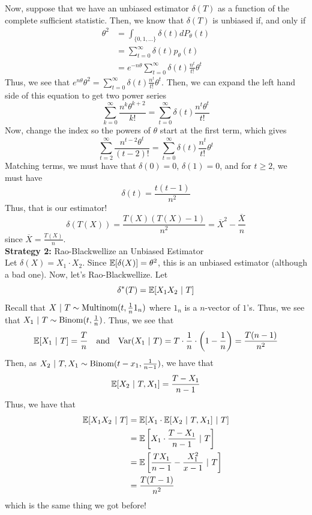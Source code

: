 Now, suppose that we have an unbiased estimator $\delta(T)$ as a function of the complete sufficient statistic. Then, we know that $\delta(T)$ is unbiased if, and only if
\begin{align*}
    \theta^2 &= \int_{\{0, 1, \ldots\}} \delta(t)dP_{\theta}(t)\\
    &= \sum_{t = 0}^{\infty} \delta(t)p_{\theta}(t)\\
    &= e^{-n\theta}\sum_{t = 0}^{\infty} \delta(t)\frac{n^{t}}{t!}\theta^t
\end{align*}
Thus, we see that $e^{n\theta} \theta^2 = \sum_{t = 0}^{\infty} \delta(t)\frac{n^{t}}{t!}\theta^t$. Then, we can expand the left hand side of this equation to get two power series
\[ \sum_{k = 0}^{\infty} \frac{n^{k}\theta^{k + 2}}{k!} = \sum_{t = 0}^{\infty} \delta(t)\frac{n^{t}\theta^{t}}{t!} \]
Now, change the index so the powers of $\theta$ start at the first term, which gives
\[ \sum_{t = 2}^{\infty} \frac{n^{t - 2}\theta^{t}}{(t - 2)!} = \sum_{t = 0}^{\infty} \delta(t)\frac{n^{t}}{t!}\theta^{t} \]
Matching terms, we must have that $\delta(0) = 0$, $\delta(1) = 0$, and for $t \geq 2$, we must have
\[ \delta(t) = \frac{t(t - 1)}{n^2} \]
Thus, that is our estimator!
\[ \delta(T(X)) = \frac{T(X)(T(X) - 1)}{n^2} = \overline{X}^2 - \frac{\overline{X}}{n} \]
since $\overline{X} = \frac{T(X)}{n}$.\\

\textbf{Strategy 2:} Rao-Blackwellize an Unbiased Estimator\\

Let $\delta(X) = X_1 \cdot X_2$. Since $\mathbb{E}[\delta(X)] = \theta^2$, this is an unbiased estimator (although a bad one). Now, let's Rao-Blackwellize. Let
\[ \delta^{*}(T) = \mathbb{E}[X_1X_2 \ |\  T] \]
Recall that $X \ |\  T \sim \text{Multinom}(t, \frac{1}{n}1_{n})$ where $1_{n}$ is a $n$-vector of $1$'s. Thus, we see that $X_1 \ |\  T \sim \text{Binom}(t, \frac{1}{n})$. Thus, we see that
\[ \mathbb{E}[X_1 \ |\  T] = \frac{T}{n} \quad \text{and} \quad \text{Var}(X_1 \ |\  T) = T \cdot \frac{1}{n} \cdot \left(1 - \frac{1}{n}\right) = \frac{T(n - 1)}{n^2} \]
Then, as $X_2 \ |\  T, X_1 \sim \text{Binom}(t - x_1, \frac{1}{n - 1})$, we have that
\[ \mathbb{E}[X_2 \ |\  T, X_1] = \frac{T - X_1}{n - 1} \]
Thus, we have that
\begin{align*}
    \mathbb{E}[X_1X_2 \ |\  T] &= \mathbb{E}[X_1 \cdot \mathbb{E}[X_2 \ |\  T, X_1] \ |\  T]\\
    &= \mathbb{E}\left[X_1 \cdot \frac{T - X_1}{n - 1} \ |\  T\right]\\
    &= \mathbb{E}\left[\frac{TX_1}{n - 1} - \frac{X_1^2}{x - 1} \ |\  T\right]\\
    &= \frac{T(T - 1)}{n^2}
\end{align*}
which is the same thing we got before!\\

